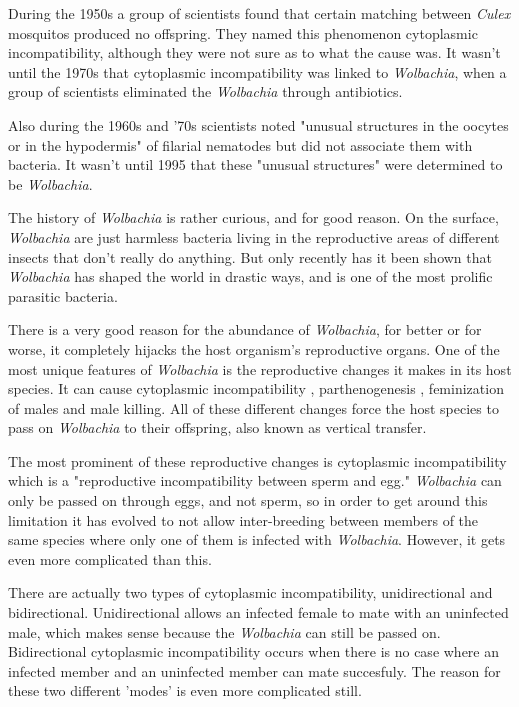 \documentclass[twocolumn]{article}
\begin{document}
During the 1950s a group of scientists found that certain matching between \textit{Culex} mosquitos produced no offspring. They named this phenomenon cytoplasmic incompatibility, although they were not sure as to what the cause was.\cite{Wcyto_iso} It wasn't until the 1970s that cytoplasmic incompatibility was linked to \textit{Wolbachia}, when a group of scientists eliminated the \textit{Wolbachia} through antibiotics.\cite{Wcyto_cause}

Also during the 1960s and '70s scientists noted "unusual structures in the oocytes or in the hypodermis" of filarial nematodes but did not associate them with bacteria.\cite{wolbachia} It wasn't until 1995 that these "unusual structures" were determined to be \textit{Wolbachia}.\cite{Wstruct} 

The history of \textit{Wolbachia} is rather curious, and for good reason. On the surface, \textit{Wolbachia} are just harmless bacteria living in the reproductive areas of different insects that don't really do anything. But only recently has it been shown that \textit{Wolbachia} has shaped the world in drastic ways, and is one of the most prolific parasitic bacteria.\cite{Wdistr}

There is a very good reason for the abundance of \textit{Wolbachia}, for better or for worse, it completely hijacks the host organism's reproductive organs. One of the most unique features of \textit{Wolbachia} is the reproductive changes it makes in its host species. It can cause cytoplasmic incompatibility \cite{Wci0}\cite{Wci1}\cite{Wci2}\cite{Wci3}, parthenogenesis \cite{Wparth}, feminization of males \cite{Wfem} and male killing.\cite{Wmale_killing} All of these different changes force the host species to pass on \textit{Wolbachia} to their offspring, also known as vertical transfer.

The most prominent of these reproductive changes is cytoplasmic incompatibility which is a "reproductive incompatibility between sperm and egg."\cite{Wbio} \textit{Wolbachia} can only be passed on through eggs, and not sperm, so in order to get around this limitation it has evolved to not allow inter-breeding between members of the same species where only one of them is infected with \textit{Wolbachia}. However, it gets even more complicated than this.

There are actually two types of cytoplasmic incompatibility, unidirectional and bidirectional. Unidirectional allows an infected female to mate with an uninfected male, which makes sense because the \textit{Wolbachia} can still be passed on. Bidirectional cytoplasmic incompatibility occurs when there is no case where an infected member and an uninfected member can mate succesfuly. The reason for these two different 'modes' is even more complicated still.
\end{document}
